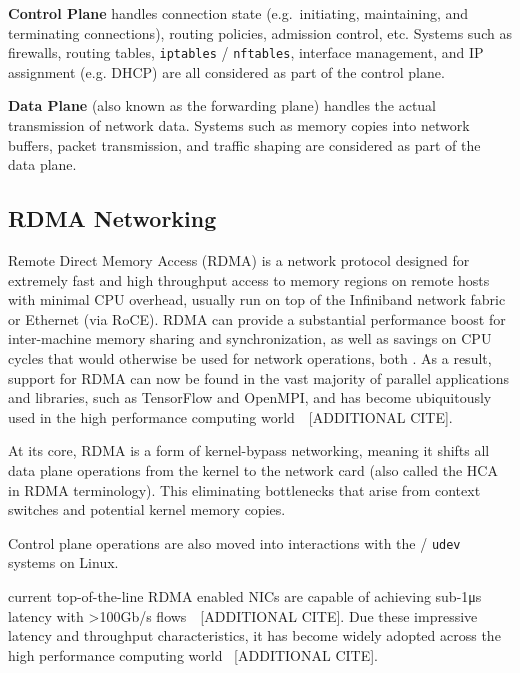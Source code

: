 \documentclass[12pt,titlepage]{article}
\begin{document}
\noindent
\textbf{Control Plane} handles connection state (e.g.\ initiating, maintaining, and terminating connections), routing policies, admission control, etc.
Systems such as firewalls, routing tables, \texttt{iptables} / \texttt{nftables}, interface management, and IP assignment (e.g. DHCP) are all considered as part of the control plane.

\noindent
\textbf{Data Plane} (also known as the forwarding plane) handles the actual transmission of network data.
Systems such as memory copies into network buffers, packet transmission, and traffic shaping are considered as part of the data plane.

\subsection{RDMA Networking}
Remote Direct Memory Access (RDMA) is a network protocol designed for extremely fast and high throughput access to memory regions on remote hosts with minimal CPU overhead, usually run on top of the Infiniband network fabric or Ethernet (via RoCE).
RDMA can provide a substantial performance boost for inter-machine memory sharing and synchronization, as well as savings on CPU cycles that would otherwise be used for network operations, both .
As a result, support for RDMA can now be found in the vast majority of parallel applications and libraries, such as TensorFlow and OpenMPI, and has become ubiquitously used in the high performance computing world~\cite{kim2019freeflow}~[ADDITIONAL CITE].

At its core, RDMA is a form of kernel-bypass networking,
meaning it shifts all data plane operations from the kernel to the network card (also called the HCA in RDMA terminology).
This eliminating bottlenecks that arise from context switches and potential kernel memory copies.


Control plane operations are also moved into interactions with the  / \texttt{udev} systems on Linux.

current top-of-the-line RDMA enabled NICs are capable of achieving sub-1\si{\micro\second} latency with >100Gb/s flows~\cite{mellanoxcx6doc}~[ADDITIONAL CITE].
Due these impressive latency and throughput characteristics, it has become widely adopted across the high performance computing world~\cite{kim2019freeflow} [ADDITIONAL CITE].
\end{document}
